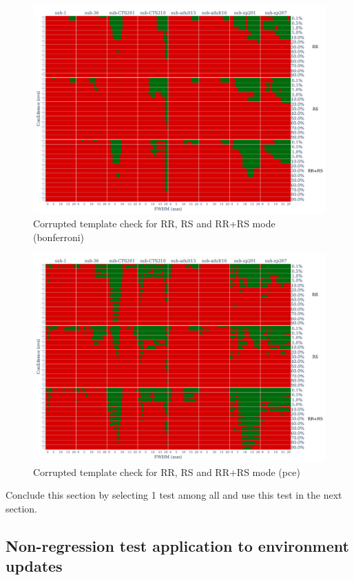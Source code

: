 \documentclass{article}
\begin{document}
\begin{figure}
    \centering
    \includegraphics[width=\linewidth]{figures/template/one_mct_fwe_bonferroni__template_annotated.pdf}
    \caption{Corrupted template check for RR, RS and RR+RS mode (bonferroni)}
\end{figure}

\begin{figure}
    \centering
    \includegraphics[width=\linewidth]{figures/template/one_pce__template_annotated.pdf}
    \caption{Corrupted template check for RR, RS and RR+RS mode (pce)}
\end{figure}


Conclude this section by selecting 1 test among all and use this test in the
next section.

\subsection{Non-regression test application to environment updates}
\end{document}
